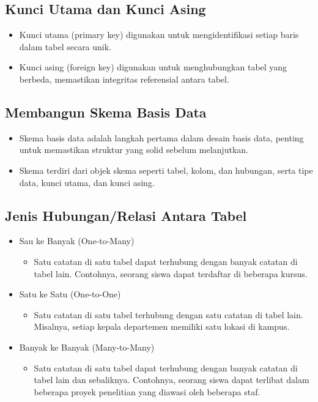 \documentclass{article}
\begin{document}
\subsection{Kunci Utama dan Kunci Asing}
\begin{itemize}
    \item Kunci utama (primary key) digunakan untuk mengidentifikasi setiap baris dalam tabel secara unik.
    \item Kunci asing (foreign key) digunakan untuk menghubungkan tabel yang berbeda, memastikan integritas referensial antara tabel.
\end{itemize}

\subsection{Membangun Skema Basis Data}
\begin{itemize}
    \item Skema basis data adalah langkah pertama dalam desain basis data, penting untuk memastikan struktur yang solid sebelum melanjutkan.
    \item Skema terdiri dari objek skema seperti tabel, kolom, dan hubungan, serta tipe data, kunci utama, dan kunci asing.
\end{itemize}

\subsection{Jenis Hubungan/Relasi Antara Tabel}
\begin{itemize}
    \item Sau ke Banyak (One-to-Many)
          \begin{itemize}
              \item Satu catatan di satu tabel dapat terhubung dengan banyak catatan di tabel lain. Contohnya, seorang siswa dapat terdaftar di beberapa kursus.
          \end{itemize}
    \item Satu ke Satu (One-to-One)
          \begin{itemize}
              \item Satu catatan di satu tabel terhubung dengan satu catatan di tabel lain. Misalnya, setiap kepala departemen memiliki satu lokasi di kampus.
          \end{itemize}
    \item Banyak ke Banyak (Many-to-Many)
          \begin{itemize}
              \item Satu catatan di satu tabel dapat terhubung dengan banyak catatan di tabel lain dan sebaliknya. Contohnya, seorang siswa dapat terlibat dalam beberapa proyek penelitian yang diawasi oleh beberapa staf.
          \end{itemize}
\end{itemize}
\end{document}

